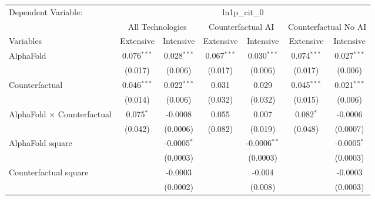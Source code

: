\begingroup
\centering
\begin{tabular}{lcccccc}
   \tabularnewline \midrule \midrule
   Dependent Variable: & \multicolumn{6}{c}{ln1p\_cit\_0}\\
 & \multicolumn{2}{c}{All Technologies} & \multicolumn{2}{c}{Counterfactual AI} & \multicolumn{2}{c}{Counterfactual No AI} \\
\cmidrule(lr){1-1}\cmidrule(lr){2-3} \cmidrule(lr){4-5} \cmidrule(lr){6-7}
Variables & \multicolumn{1}{c}{Extensive} & \multicolumn{1}{c}{Intensive} & \multicolumn{1}{c}{Extensive} & \multicolumn{1}{c}{Intensive} & \multicolumn{1}{c}{Extensive} & \multicolumn{1}{c}{Intensive} \\
\cmidrule(lr){1-1}\cmidrule(lr){2-2} \cmidrule(lr){3-3} \cmidrule(lr){4-4} \cmidrule(lr){5-5} \cmidrule(lr){6-6} \cmidrule(lr){7-7}
   AlphaFold                          & 0.076$^{***}$ & 0.028$^{***}$ & 0.067$^{***}$ & 0.030$^{***}$  & 0.074$^{***}$ & 0.027$^{***}$\\   
                                      & (0.017)       & (0.006)       & (0.017)       & (0.006)        & (0.017)       & (0.006)\\   
   Counterfactual                     & 0.046$^{***}$ & 0.022$^{***}$ & 0.031         & 0.029          & 0.045$^{***}$ & 0.021$^{***}$\\   
                                      & (0.014)       & (0.006)       & (0.032)       & (0.032)        & (0.015)       & (0.006)\\   
   AlphaFold $\times$ Counterfactual  & 0.075$^{*}$   & -0.0008       & 0.055         & 0.007          & 0.082$^{*}$   & -0.0006\\   
                                      & (0.042)       & (0.0006)      & (0.082)       & (0.019)        & (0.048)       & (0.0007)\\   
   AlphaFold square                   &               & -0.0005$^{*}$ &               & -0.0006$^{**}$ &               & -0.0005$^{*}$\\   
                                      &               & (0.0003)      &               & (0.0003)       &               & (0.0003)\\   
   Counterfactual square              &               & -0.0003       &               & -0.004         &               & -0.0003\\   
                                      &               & (0.0002)      &               & (0.008)        &               & (0.0003)\\   

\end{tabular}
